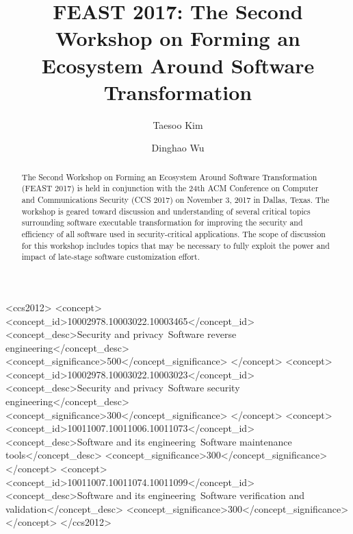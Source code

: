 \documentclass[sigconf]{acmart}
\begin{document}
\title{FEAST 2017: The Second Workshop on Forming an Ecosystem Around Software Transformation}


\author{Taesoo Kim}

\author{Dinghao Wu}


\renewcommand{\shortauthors}{Taesoo Kim and Dinghao Wu}


\begin{abstract}
The Second Workshop on Forming an Ecosystem
Around Software Transformation (FEAST 2017)
is held in conjunction with the 24th ACM
Conference on Computer and Communications
Security (CCS 2017) on November 3, 2017 in Dallas, Texas. The
workshop is geared toward discussion and
understanding of several critical topics surrounding
software executable transformation for improving
the security and efficiency of all software used in
security-critical applications. The scope of
discussion for this workshop includes topics that
may be necessary to fully exploit the power and
impact of late-stage software customization effort.
\end{abstract}

%
%
\begin{CCSXML}
<ccs2012>
<concept>
<concept_id>10002978.10003022.10003465</concept_id>
<concept_desc>Security and privacy~Software reverse engineering</concept_desc>
<concept_significance>500</concept_significance>
</concept>
<concept>
<concept_id>10002978.10003022.10003023</concept_id>
<concept_desc>Security and privacy~Software security engineering</concept_desc>
<concept_significance>300</concept_significance>
</concept>
<concept>
<concept_id>10011007.10011006.10011073</concept_id>
<concept_desc>Software and its engineering~Software maintenance tools</concept_desc>
<concept_significance>300</concept_significance>
</concept>
<concept>
<concept_id>10011007.10011074.10011099</concept_id>
<concept_desc>Software and its engineering~Software verification and validation</concept_desc>
<concept_significance>300</concept_significance>
</concept>
</ccs2012>
\end{CCSXML}
\end{document}
